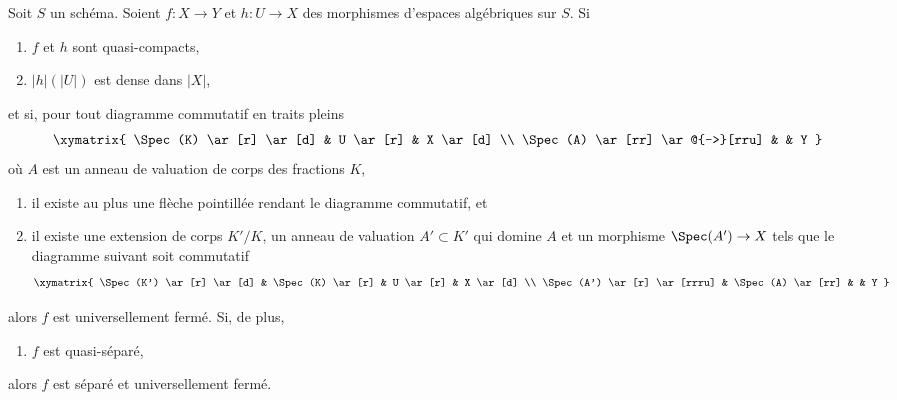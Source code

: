 \begin{lemma}
\label{lemma-refined-valuative-criterion-universally-closed}
Soit $S$ un schéma. Soient $f : X \to Y$ et $h : U \to X$ des morphismes
d'espaces algébriques sur $S$. Si
\begin{enumerate}
\item $f$ et $h$ sont quasi-compacts,
\item $|h|(|U|)$ est dense dans $|X|$,
\end{enumerate}
et si, pour tout diagramme commutatif en traits pleins
$$
\xymatrix{
\Spec(K) \ar[r] \ar[d] & U \ar[r] & X \ar[d] \\
\Spec(A) \ar[rr] \ar@{-->}[rru] & & Y
}
$$
où $A$ est un anneau de valuation de corps des fractions $K$,
\begin{enumerate}
\item[(3)] il existe au plus une flèche pointillée rendant le diagramme
commutatif, et
\item[(4)] il existe une extension de corps $K'/K$, un
anneau de valuation $A' \subset K'$ qui domine $A$ et un morphisme
$\Spec(A') \to X$ tels que le diagramme suivant soit commutatif
$$
\xymatrix{
\Spec(K') \ar[r] \ar[d] & \Spec(K) \ar[r] & U \ar[r] & X \ar[d] \\
\Spec(A') \ar[r] \ar[rrru] & \Spec(A) \ar[rr] & & Y
}
$$
\end{enumerate}
alors $f$ est universellement fermé. Si, de plus,
\begin{enumerate}
\item[(5)] $f$ est quasi-séparé,
\end{enumerate}
alors $f$ est séparé et universellement fermé.
\end{lemma}


